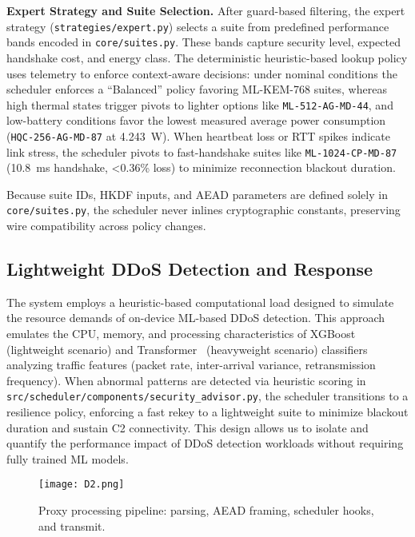 \documentclass[sigconf,natbib=false]{acmart}
\begin{document}
\textbf{Expert Strategy and Suite Selection.}
After guard-based filtering, the expert strategy (\texttt{strategies/expert.py}) selects a suite from predefined performance bands encoded in \texttt{core/suites.py}. These bands capture security level, expected handshake cost, and energy class. The deterministic heuristic-based lookup policy uses telemetry to enforce context-aware decisions: under nominal conditions the scheduler enforces a ``Balanced'' policy favoring ML-KEM-768 suites, whereas high thermal states trigger pivots to lighter options like \texttt{ML-512-AG-MD-44}, and low-battery conditions favor the lowest measured average power consumption (\texttt{HQC-256-AG-MD-87} at 4.243~W). When heartbeat loss or RTT spikes indicate link stress, the scheduler pivots to fast-handshake suites like \texttt{ML-1024-CP-MD-87} (10.8~ms handshake, <0.36\% loss) to minimize reconnection blackout duration.

Because suite IDs, HKDF inputs, and AEAD parameters are defined solely in \texttt{core/suites.py}, the scheduler never inlines cryptographic constants, preserving wire compatibility across policy changes.

\subsection{Lightweight DDoS Detection and Response}

The system employs a heuristic-based computational load designed to simulate the resource demands of on-device ML-based DDoS detection. This approach emulates the CPU, memory, and processing characteristics of XGBoost~\cite{xgboost_2016} (lightweight scenario) and Transformer~\cite{futureinternet_transformer_iiot_2025} (heavyweight scenario) classifiers analyzing traffic features (packet rate, inter-arrival variance, retransmission frequency). When abnormal patterns are detected via heuristic scoring in \texttt{src/scheduler/components/security\_advisor.py}, the scheduler transitions to a resilience policy, enforcing a fast rekey to a lightweight suite to minimize blackout duration and sustain C2 connectivity. This design allows us to isolate and quantify the performance impact of DDoS detection workloads without requiring fully trained ML models.

\begin{figure}[h]
  \centering
  \texttt{[image: D2.png]}
  \caption{Proxy processing pipeline: parsing, AEAD framing, scheduler hooks, and transmit.}
  \label{fig:proxy_pipeline}
\end{figure}
\end{document}
